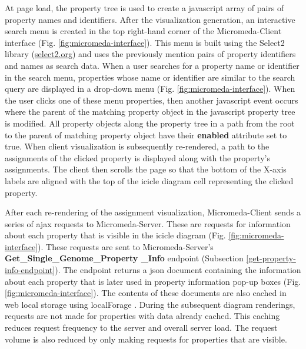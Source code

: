 At page load, the property tree is used to create a \gls{javascript} array of 
pairs of property names and identifiers. After the visualization generation, an 
interactive search menu is created in the top right-hand corner of the 
Micromeda-Client interface (Fig. \ref{fig:micromeda-interface}). This menu is 
built using the Select2 library \cite{select2} 
(\href{http://select2.org}{select2.org}) and uses the previously mention pairs 
of property identifiers and names as search data. When a user searches for a 
property name or identifier in the search menu, properties whose name or 
identifier are similar to the search query are displayed in a drop-down menu 
(Fig. \ref{fig:micromeda-interface}). When the user clicks one of these menu 
properties, then another \gls{javascript} event occurs where the parent of the 
matching property object in the \gls{javascript} property tree is modified. All 
property objects along the property tree in a path from the root to the parent 
of matching property object have their \textbf{enabled} attribute set to true. 
When client visualization is subsequently re-rendered, a path to the assignments 
of the clicked property is displayed along with the property's assignments. The 
client then scrolls the page so that the bottom of the X-axis labels are aligned 
with the top of the icicle diagram cell representing the clicked property.

After each re-rendering of the assignment visualization, Micromeda-Client sends 
a series of \gls{ajax}  requests to Micromeda-Server. These are requests for 
information about each property that is visible in the icicle diagram (Fig. 
\ref{fig:micromeda-interface}). These requests are sent to Micromeda-Server's 
\textbf{Get\_Single\_Genome\_Property \_Info} endpoint (Subsection 
\ref{get-property-info-endpoint}). The endpoint returns a \gls{json} document 
containing the information about each property that is later used in property 
information pop-up boxes (Fig. \ref{fig:micromeda-interface}). The contents of 
these documents are also cached in web local storage using localForage 
\cite{localforage}. During the subsequent diagram renderings, requests are not 
made for properties with data already cached. This caching reduces request 
frequency to the server and overall server load. The request volume is also 
reduced by only making requests for properties that are visible.

